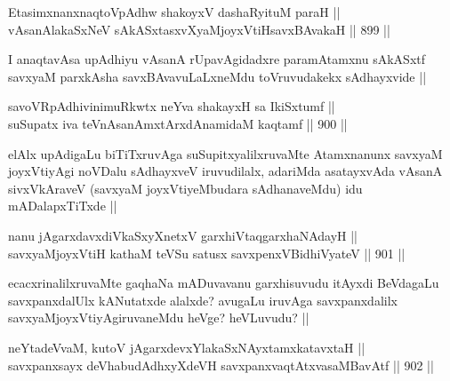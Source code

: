 
\begin{shl}
EtasimxnanxnaqtoVpAdhw shakoyxV dashaRyituM paraH || \\
vAsanAlakaSxNeV sAkASxtasxvXyaMjoyxVtiHsavxBAvakaH ||  899 ||  
\end{shl}

\begin{artha}
I anaqtavAsa upAdhiyu vAsanA rUpavAgidadxre paramAtamxnu sAkASxtf savxyaM parxkAsha savxBAvavuLaLxneMdu toVruvudakekx sAdhayxvide ||
\end{artha}


\begin{shl}
savoVRpAdhivinimuRkwtx neYva shakayxH sa IkiSxtumf ||  \\
suSupatx iva teVnAsanAmxtArxdAnamidaM kaqtamf ||  900 ||  
\end{shl}

\begin{artha}
elAlx upAdigaLu biTiTxruvAga suSupitxyalilxruvaMte Atamxnanunx savxyaM joyxVtiyAgi noVDalu sAdhayxveV iruvudilalx, adariMda asatayxvAda vAsanA sivxVkAraveV (savxyaM joyxVtiyeMbudara sAdhanaveMdu) idu mADalapxTiTxde ||
\end{artha}


\begin{shl}
nanu jAgarxdavxdiVkaSxyXnetxV garxhiVtaqgarxhaNAdayH || \\
savxyaMjoyxVtiH kathaM teVSu satusx savxpenxV\s BidhiVyateV ||  901 ||  
\end{shl}

\begin{artha}
ecacxrinalilxruvaMte gaqhaNa mADuvavanu garxhisuvudu itAyxdi BeVdagaLu savxpanxdalUlx kANutatxde alalxde? avugaLu iruvAga savxpanxdalilx savxyaMjoyxVtiyAgiruvaneMdu heVge? heVLuvudu? ||
\end{artha}


\begin{shl}
neYtadeVvaM, kutoV jAgarxdevxYlakaSxNAyxtamxkatavxtaH || \\
savxpanxsayx deVhabudAdhxyXdeVH savxpanxvaqtAtxvasaMBavAtf ||  902 ||  
\end{shl}

